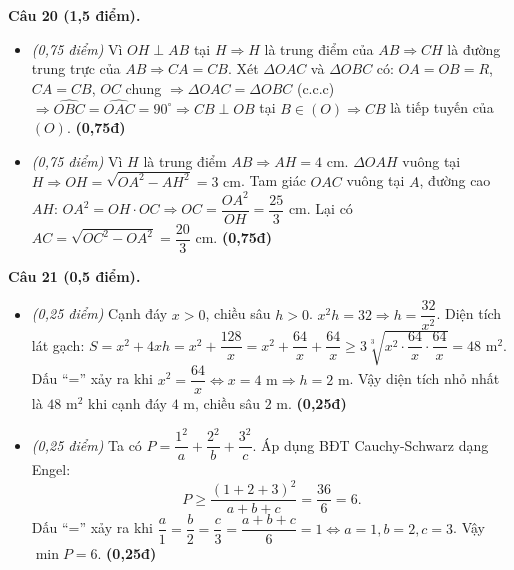 \documentclass[11pt,a4paper]{article}
\begin{document}
\vspace{1mm}
\textbf{Câu 20 (1,5 điểm).}
\begin{itemize}
  \item[a)] \textit{(0,75 điểm)} Vì $OH \perp AB$ tại $H \Rightarrow H$ là trung điểm của $AB \Rightarrow CH$ là đường trung trực của $AB \Rightarrow CA = CB$. Xét $\Delta OAC$ và $\Delta OBC$ có: $OA = OB = R$, $CA = CB$, $OC$ chung $\Rightarrow \Delta OAC = \Delta OBC$ (c.c.c) $\Rightarrow \widehat{OBC} = \widehat{OAC} = 90^\circ \Rightarrow CB \perp OB$ tại $B \in (O) \Rightarrow CB$ là tiếp tuyến của $(O)$. \hfill \textbf{(0,75đ)}
  \item[b)] \textit{(0,75 điểm)} Vì $H$ là trung điểm $AB \Rightarrow AH = 4\text{ cm}$. $\Delta OAH$ vuông tại $H \Rightarrow OH = \sqrt{OA^2 - AH^2} = 3\text{ cm}$. Tam giác $OAC$ vuông tại $A$, đường cao $AH$:
  $OA^2 = OH \cdot OC \Rightarrow OC = \dfrac{OA^2}{OH} = \dfrac{25}{3}\text{ cm}$. Lại có $AC = \sqrt{OC^2 - OA^2} = \dfrac{20}{3}\text{ cm}$. \hfill \textbf{(0,75đ)}
\end{itemize}

\vspace{1mm}
\textbf{Câu 21 (0,5 điểm).}
\begin{itemize}
  \item[a)] \textit{(0,25 điểm)} Cạnh đáy $x > 0$, chiều sâu $h > 0$. $x^2 h = 32 \Rightarrow h = \dfrac{32}{x^2}$. Diện tích lát gạch: $S = x^2 + 4xh = x^2 + \dfrac{128}{x} = x^2 + \dfrac{64}{x} + \dfrac{64}{x} \ge 3\sqrt[3]{x^2 \cdot \dfrac{64}{x} \cdot \dfrac{64}{x}} = 48\text{ m}^2$. Dấu ``='' xảy ra khi $x^2 = \dfrac{64}{x} \Leftrightarrow x = 4\text{ m} \Rightarrow h = 2\text{ m}$. Vậy diện tích nhỏ nhất là $48\text{ m}^2$ khi cạnh đáy $4\text{ m}$, chiều sâu $2\text{ m}$. \hfill \textbf{(0,25đ)}
  \item[b)] \textit{(0,25 điểm)} Ta có $P = \dfrac{1^2}{a} + \dfrac{2^2}{b} + \dfrac{3^2}{c}$. Áp dụng BĐT Cauchy-Schwarz dạng Engel:
  \[
  P \ge \dfrac{(1+2+3)^2}{a+b+c} = \dfrac{36}{6} = 6.
  \]
  Dấu ``='' xảy ra khi $\dfrac{a}{1} = \dfrac{b}{2} = \dfrac{c}{3} = \dfrac{a+b+c}{6} = 1 \Leftrightarrow a = 1, b = 2, c = 3$. Vậy $\min P = 6$. \hfill \textbf{(0,25đ)}
\end{itemize}
\end{document}
